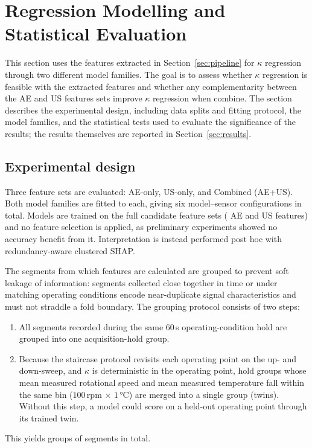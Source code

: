 \section{Regression Modelling and Statistical Evaluation}
\label{sec:modelling}
This section uses the features extracted in Section~\ref{sec:pipeline} for $\kappa$ regression through two different model families. The goal is to assess whether $\kappa$ regression is feasible with the extracted features and whether any complementarity between the AE and US features sets improve $\kappa$ regression when combine. The section describes the experimental design, including data splits and fitting protocol, the model families, and the statistical tests used to evaluate the significance of the results; the results themselves are reported in Section~\ref{sec:results}.

\subsection{Experimental design}
\label{subsec:modelling_design}
Three feature sets are evaluated: AE-only, US-only, and Combined (AE+US). Both model families are fitted to each, giving six model--sensor configurations in total. Models are trained on the full candidate feature sets (\resNcandAe{} AE and \resNcandUs{} US features) and no feature selection is applied, as preliminary experiments showed no accuracy benefit from it. Interpretation is instead performed post hoc with redundancy-aware clustered SHAP.

The segments from which features are calculated are grouped to prevent soft leakage of information: segments collected close together in time or under matching operating conditions encode near-duplicate signal characteristics and must not straddle a fold boundary. The grouping protocol consists of two steps:
\begin{enumerate}
  \item All segments recorded during the same 60\,s operating-condition hold are grouped into one acquisition-hold group.
  \item Because the staircase protocol revisits each operating point on the up- and down-sweep, and $\kappa$ is deterministic in the operating point, hold groups whose mean measured rotational speed and mean measured temperature fall within the same bin ($100$\,rpm $\times$ $1\,\si{\celsius}$) are merged into a single group (twins). Without this step, a model could score on a held-out operating point through its trained twin. 
\end{enumerate}
This yields \resNgroups{} groups of \resNwindowsPooled{} segments in total.

